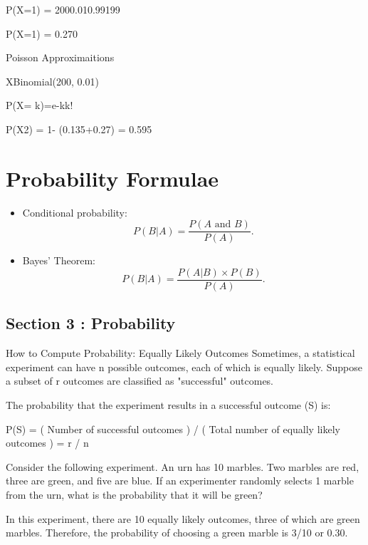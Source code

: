 \documentclass[12pt]{report}
\begin{document}
P(X=1) = 2000.010.99199

P(X=1) = 0.270


Poisson Approximaitions


XBinomial(200, 0.01) 


P(X= k)=e-kk!




P(X2) = 1- (0.135+0.27) = 0.595



\section{Probability Formulae}

\begin{itemize}
	
	\item Conditional probability:
	\begin{equation*}
	P(B|A)=\frac{P\left( A\text{ and }B\right) }{P\left( A\right) }.
	\end{equation*}
	
	
	\item Bayes' Theorem:
	\begin{equation*}
	P(B|A)=\frac{P\left(A|B\right) \times P(B) }{P\left( A\right) }.
	\end{equation*}
\end{itemize}
\subsection*{Section 3 : Probability}

How to Compute Probability: Equally Likely Outcomes
Sometimes, a statistical experiment can have n possible outcomes, each of which is equally likely. Suppose a subset of r outcomes are classified as "successful" outcomes.

The probability that the experiment results in a successful outcome (S) is:

P(S) = ( Number of successful outcomes ) / ( Total number of equally likely outcomes ) = r / n

Consider the following experiment. An urn has 10 marbles. Two marbles are red, three are green, and five are blue. If an experimenter randomly selects 1 marble from the urn, what is the probability that it will be green?

In this experiment, there are 10 equally likely outcomes, three of which are green marbles. Therefore, the probability of choosing a green marble is 3/10 or 0.30.
\end{document}
